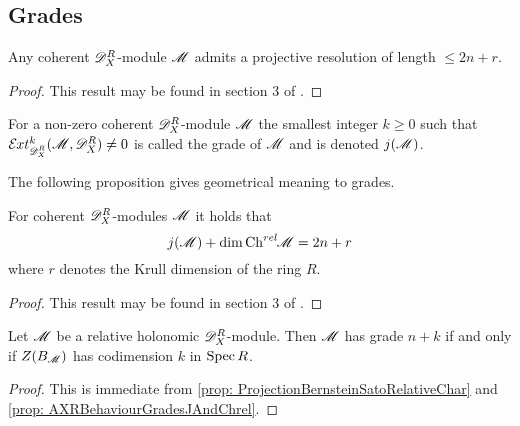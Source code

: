 \subsection{Grades}
\begin{proposition}\label{prop: ProjectiveResolutionLength}
  Any coherent $\mathscr{D}_X^R$-module $\mathscr{M}$ admits a projective resolution of length $\leq 2n + r$.
\end{proposition}
\begin{proof}
  This result may be found in section 3 of \cite{budur2019zero}.
\end{proof}
\begin{definition}
  For a non-zero coherent $\mathscr{D}_X^R$-module $\mathscr{M}$ the smallest integer $k\geq 0$ such that $\Ex{\D_X^R}{k}(\M,\D_X^R)\neq 0$ is called the grade of $\mathscr{M}$ and is denoted $j(\mathscr{M})$.
\end{definition}
The following proposition gives geometrical meaning to grades.
\begin{proposition}\label{prop: AXRBehaviourGradesJAndChrel}
  For coherent $\mathscr{D}_X^R$-modules $\mathscr{M}$ it holds that
  $$j(\mathscr{M}) + \dim \operatorname{Ch}^{rel}\mkern-5mu \mathscr{M} = 2n + r $$
  where $r$ denotes the Krull dimension of the ring $R$.
\end{proposition}
\begin{proof}
  This result may be found in section 3 of \cite{budur2019zero}.
\end{proof}
\begin{corollary}\label{cor: GradeIFFBernsteinIdeal}
  Let $\mathscr{M}$ be a relative holonomic $\mathscr{D}_X^R$-module. Then $\mathscr{M}$ has grade $n + k$ if and only if $Z(B_{\mathscr{M}})$ has codimension $k$ in $\operatorname{Spec} R$.
\end{corollary}
\begin{proof}
  This is immediate from \cref{prop: ProjectionBernsteinSatoRelativeChar} and \cref{prop: AXRBehaviourGradesJAndChrel}.
\end{proof}


